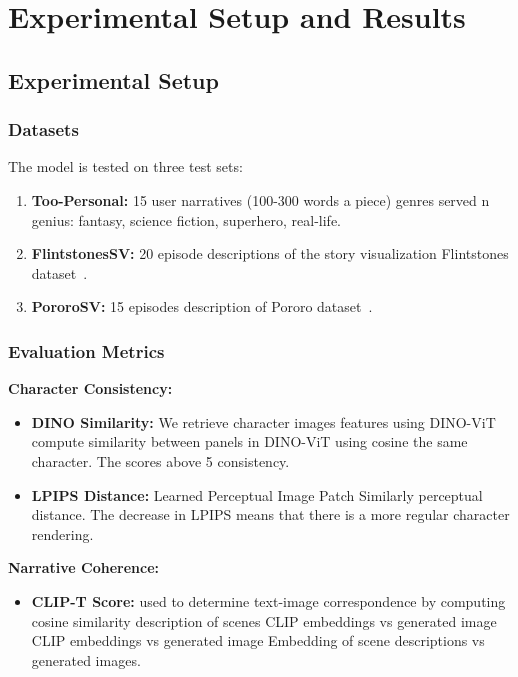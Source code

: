 \documentclass[runningheads]{llncs}
\begin{document}
\section{Experimental Setup and Results}
\label{sec:experiments}

\subsection{Experimental Setup}

\subsubsection{Datasets}

The model is tested on three test sets:
\begin{enumerate}
\item \textbf{Too-Personal:} 15 user narratives (100-300 words a piece) genres served n genius: fantasy, science fiction, superhero, real-life.
\item \textbf{FlintstonesSV:} 20 episode descriptions of the story visualization Flintstones dataset~\cite{zhou2024storydiffusion}.
\item \textbf{PororoSV:} 15 episodes description of Pororo dataset~\cite{he2024dreamstory}.
\end{enumerate}

\subsubsection{Evaluation Metrics}

\textbf{Character Consistency:}
\begin{itemize}
\item \textbf{DINO Similarity:} We retrieve character images features using DINO-ViT compute similarity between panels in DINO-ViT using cosine the same character. The scores above 5 consistency.
\item \textbf{LPIPS Distance:} Learned Perceptual Image Patch Similarly perceptual distance. The decrease in LPIPS means that there is a more regular character rendering.
\end{itemize}

\textbf{Narrative Coherence:}
\begin{itemize}
\item \textbf{CLIP-T Score:} used to determine text-image correspondence by computing cosine similarity description of scenes CLIP embeddings vs generated image CLIP embeddings vs generated image Embedding of scene descriptions vs generated images.
\end{itemize}
\end{document}
